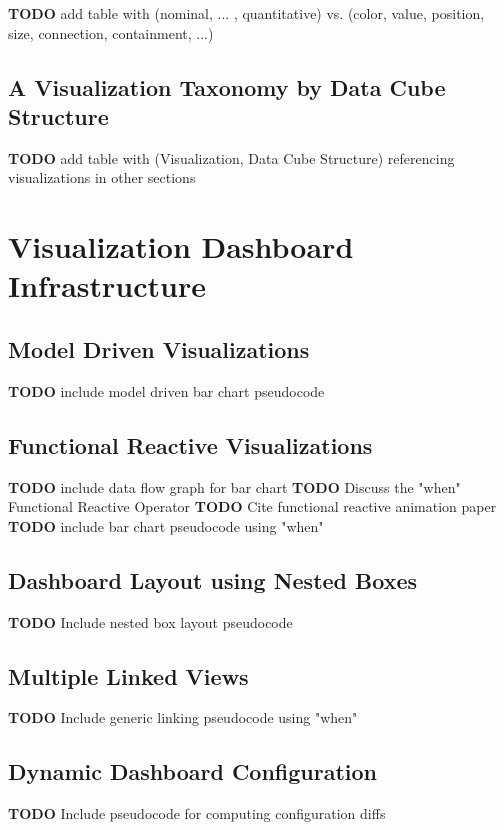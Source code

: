 \documentclass[12pt]{report}
\newcommand{\TODO}[1]{{ \color{red}\textbf{TODO} #1 }}
\begin{document}
\begin{doublespace}
\TODO{ add table with (nominal, ... , quantitative) vs. (color, value, position, size, connection, containment, ...)}
\subsection{A Visualization Taxonomy by Data Cube Structure}
\TODO{ add table with (Visualization, Data Cube Structure) referencing visualizations in other sections}

\pagebreak
\section{Visualization Dashboard Infrastructure}
\subsection{Model Driven Visualizations}
\TODO{ include model driven bar chart pseudocode}
\subsection{Functional Reactive Visualizations}
\TODO{ include data flow graph for bar chart}
\TODO { Discuss the "when" Functional Reactive Operator}
\TODO { Cite functional reactive animation paper}
\TODO{ include bar chart pseudocode using "when"}
\subsection{Dashboard Layout using Nested Boxes}
\TODO{Include nested box layout pseudocode}
\subsection{Multiple Linked Views}
\TODO{Include generic linking pseudocode using "when"}
\subsection{Dynamic Dashboard Configuration}
\TODO{Include pseudocode for computing configuration diffs}


\end{doublespace}
\end{document}
